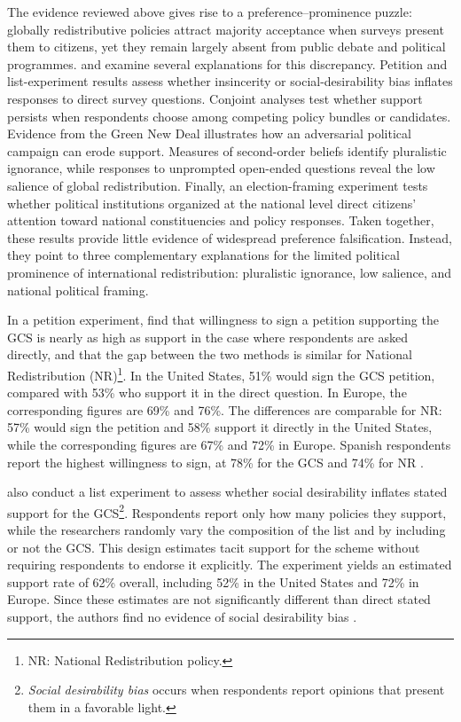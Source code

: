 \documentclass[11pt,a4paper]{article}
\begin{document}
The evidence reviewed above gives rise to a preference--prominence puzzle: globally redistributive policies attract majority acceptance when surveys present them to citizens, yet they remain largely absent from public debate and political programmes. \citet{fabre_majority_2025} and \citet{fabre_public_2026} examine several explanations for this discrepancy. Petition and list-experiment results assess whether insincerity or social-desirability bias inflates responses to direct survey questions. Conjoint analyses test whether support persists when respondents choose among competing policy bundles or candidates. Evidence from the Green New Deal illustrates how an adversarial political campaign can erode support. Measures of second-order beliefs identify pluralistic ignorance, while responses to unprompted open-ended questions reveal the low salience of global redistribution. Finally, an election-framing experiment tests whether political institutions organized at the national level direct citizens' attention toward national constituencies and policy responses. Taken together, these results provide little evidence of widespread preference falsification. Instead, they point to three complementary explanations for the limited political prominence of international redistribution: pluralistic ignorance, low salience, and national political framing.

In a petition experiment, \citet{fabre_majority_2025} find that willingness to sign a petition supporting the GCS is nearly as high as support in the case where respondents are asked directly, and that the gap between the two methods is similar for National Redistribution (NR)\footnote{NR: National Redistribution policy.}. In the United States, 51\% would sign the GCS petition, compared with 53\% who support it in the direct question. In Europe, the corresponding figures are 69\% and 76\%. The differences are comparable for NR: 57\% would sign the petition and 58\% support it directly in the United States, while the corresponding figures are 67\% and 72\% in Europe. Spanish respondents report the highest willingness to sign, at 78\% for the GCS and 74\% for NR \citep[Figure S27]{fabre_majority_2025}.

\citet{fabre_majority_2025} also conduct a list experiment to assess whether social desirability inflates stated support for the GCS\footnote{\textit{Social desirability bias} occurs when respondents report opinions that present them in a favorable light.}. Respondents report only how many policies they support, while the researchers randomly vary the composition of the list and by including or not the GCS. This design estimates tacit support for the scheme without requiring respondents to endorse it explicitly. The experiment yields an estimated support rate of 62\% overall, including 52\% in the United States and 72\% in Europe. Since these estimates are not significantly different than direct stated support, the authors find no evidence of social desirability bias \citep[Table 1]{fabre_majority_2025_si}. 
\end{document}
